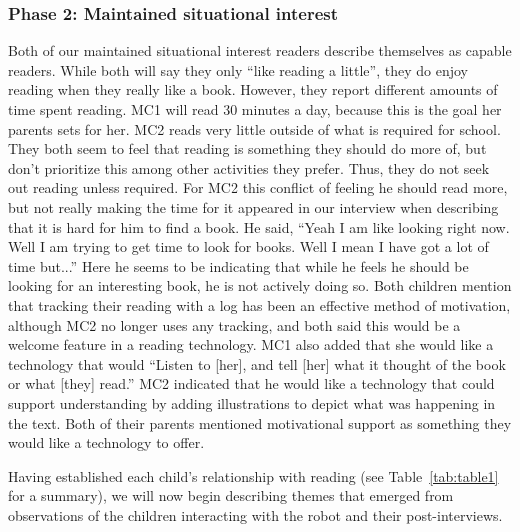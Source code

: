 \documentclass{sigchi}
\begin{document}
\subsubsection{Phase 2: Maintained situational interest}
Both of our maintained situational interest readers describe themselves as capable readers. While both will say they only ``like reading a little'', they do enjoy reading when they really like a book. However, they report different amounts of time spent reading. MC1 will read 30 minutes a day, because this is the goal her parents sets for her. MC2 reads very little outside of what is required for school. They both seem to feel that reading is something they should do more of, but don't prioritize this among other activities they prefer. Thus, they do not seek out reading unless required. For MC2 this conflict of feeling he should read more, but not really making the time for it appeared in our interview when describing that it is hard for him to find a book. He said, ``Yeah I am like looking right now. Well I am trying to get time to look for books. Well I mean I have got a lot of time but...'' Here he seems to be indicating that while he feels he should be looking for an interesting book, he is not actively doing so. Both children mention that tracking their reading with a log has been an effective method of motivation, although MC2 no longer uses any tracking, and both said this would be a welcome feature in a reading technology. MC1 also added that she would like a technology that would ``Listen to [her], and tell [her] what it thought of the book or what [they] read.'' MC2 indicated that he would like a technology that could support understanding by adding illustrations to depict what was happening in the text. Both of their parents mentioned motivational support as something they would like a technology to offer.

Having established each child's relationship with reading (see Table~\ref{tab:table1} for a summary), we will now begin describing themes that emerged from observations of the children interacting with the robot and their post-interviews.
\end{document}
